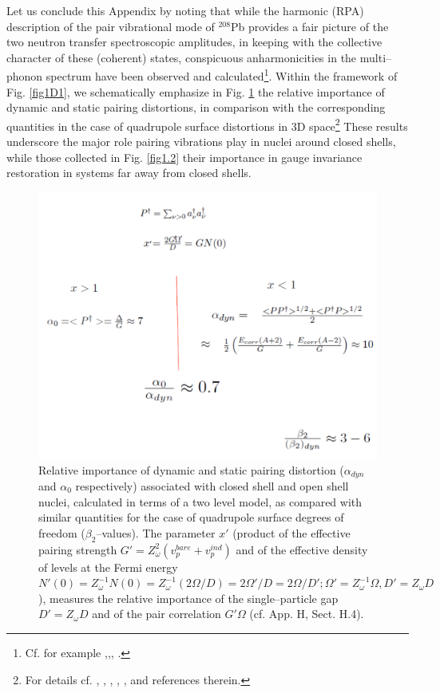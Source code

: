Let us conclude this Appendix by noting that while the harmonic (RPA) description of the pair vibrational mode of $^{208}$Pb provides a fair picture of the two neutron transfer spectroscopic amplitudes, in keeping with the collective character of these (coherent) states, conspicuous anharmonicities in the multi--phonon spectrum have been observed and calculated\footnote{Cf. for example \cite{Flynn:72},\cite{Lanford:73},\cite{Bortignon:78}, \cite{Clark:06}.}. Within the framework of Fig. \ref{fig1D1}, we schematically emphasize in Fig. \ref{fig1_E8} the relative importance of dynamic and static pairing distortions, in comparison with the corresponding quantities in the case of quadrupole surface distortions in 3D space\footnote{For details cf. \cite{Bes:77}, \cite{Broglia:68}, \cite{Bes:88}, \cite{Shimizu:89}, \cite{Shimizu:13}, \cite{Vaquero:13} and references therein.}  These results underscore the major role pairing vibrations play in nuclei around closed shells, while those collected in Fig. \ref{fig1.2} their importance in gauge invariance restoration in systems far away from closed shells.
  \begin{figure}
  \centerline{\includegraphics*[width=\textwidth,angle=0]{nutshell/figs/fig1E8.pdf}}
  \caption{Relative importance of dynamic and static pairing distortion ($\alpha_{dyn}$ and $\alpha_0$ respectively) associated with closed shell and open shell  nuclei, calculated in terms of a two level model, as compared with similar quantities for the case of quadrupole surface degrees of freedom ($\beta_2$--values). The parameter $x'$ (product of the effective pairing strength $G'=Z_\omega^2(v_p^{bare}+v_p^{ind})$ and of the effective density of levels at the Fermi energy $N'(0)=Z_\omega^{-1}N(0)=Z^{-1}_\omega(2\Omega/D)=2\Omega'/D=2\Omega/D';\Omega'=Z_\omega^{-1}\Omega,D'=Z_\omega D$), measures the relative importance of the single--particle gap $D'=Z_\omega D$ and of the pair correlation $G'\Omega$ (cf. \cite{Brink:05} App. H, Sect. H.4).}\label{fig1_E8}
  \end{figure}
